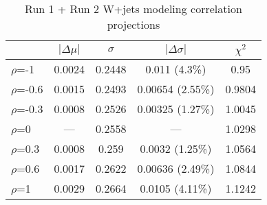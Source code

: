\begin{table}[!htbp]
\begin{center}\begin{tabular}{lcccc}
\hline\hline
 & $\left|\Delta\mu\right|$ & $\sigma$ & $\left|\Delta\sigma\right|$ & $\chi^2$\\
\hline
$\rho$=-1 & 0.0024 & 0.2448 & 0.011 (4.3\%) & 0.95\\
\hline
$\rho$=-0.6 & 0.0015 & 0.2493 & 0.00654 (2.55\%) & 0.9804\\
\hline
$\rho$=-0.3 & 0.0008 & 0.2526 & 0.00325 (1.27\%) & 1.0045\\
\hline
$\rho$=0 & --- & 0.2558 & --- & 1.0298\\
\hline
$\rho$=0.3 & 0.0008 & 0.259 & 0.0032 (1.25\%) & 1.0564\\
\hline
$\rho$=0.6 & 0.0017 & 0.2622 & 0.00636 (2.49\%) & 1.0844\\
\hline
$\rho$=1 & 0.0029 & 0.2664 & 0.0105 (4.11\%) & 1.1242\\
\hline\hline
\end{tabular}
\caption{Run 1 + Run 2 W+jets modeling correlation projections}
\end{center}
\label{tab:wjets_correlation}
\end{table}

